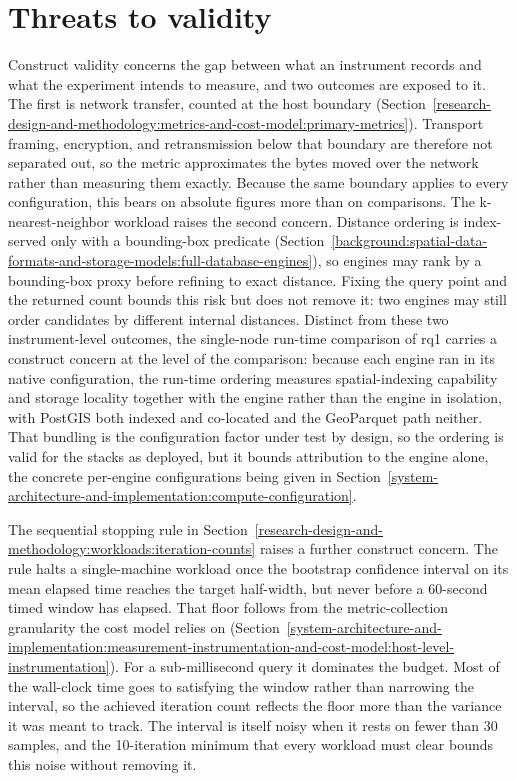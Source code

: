 \section{Threats to validity}
\label{research-design-and-methodology:threats-to-validity}

Construct validity concerns the gap between what an instrument records and what the experiment intends to measure, and two outcomes are exposed to it. The first is network transfer, counted at the host boundary (Section~\ref{research-design-and-methodology:metrics-and-cost-model:primary-metrics}). Transport framing, encryption, and retransmission below that boundary are therefore not separated out, so the metric approximates the bytes moved over the network rather than measuring them exactly. Because the same boundary applies to every configuration, this bears on absolute figures more than on comparisons. The k-nearest-neighbor workload raises the second concern. Distance ordering is index-served only with a bounding-box predicate (Section~\ref{background:spatial-data-formats-and-storage-models:full-database-engines}), so engines may rank by a bounding-box proxy before refining to exact distance. Fixing the query point and the returned count bounds this risk but does not remove it: two engines may still order candidates by different internal distances. Distinct from these two instrument-level outcomes, the single-node run-time comparison of \acrshort{rq}1 carries a construct concern at the level of the comparison: because each engine ran in its native configuration, the run-time ordering measures spatial-indexing capability and storage locality together with the engine rather than the engine in isolation, with PostGIS both indexed and co-located and the GeoParquet path neither. That bundling is the configuration factor under test by design, so the ordering is valid for the stacks as deployed, but it bounds attribution to the engine alone, the concrete per-engine configurations being given in Section~\ref{system-architecture-and-implementation:compute-configuration}.

The sequential stopping rule in Section~\ref{research-design-and-methodology:workloads:iteration-counts} raises a further construct concern. The rule halts a single-machine workload once the bootstrap confidence interval on its mean elapsed time reaches the target half-width, but never before a \num{60}-second timed window has elapsed. That floor follows from the metric-collection granularity the cost model relies on (Section~\ref{system-architecture-and-implementation:measurement-instrumentation-and-cost-model:host-level-instrumentation}). For a sub-millisecond query it dominates the budget. Most of the wall-clock time goes to satisfying the window rather than narrowing the interval, so the achieved iteration count reflects the floor more than the variance it was meant to track. The interval is itself noisy when it rests on fewer than \num{30} samples, and the \num{10}-iteration minimum that every workload must clear bounds this noise without removing it.

